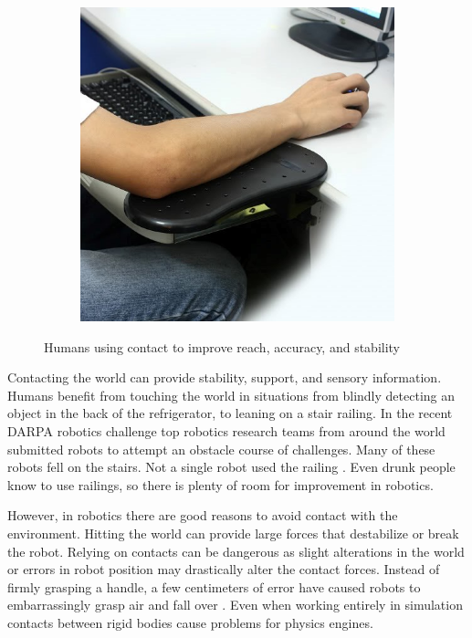 \documentclass[../thesis.tex]{subfiles}
\begin{document}
\begin{figure}
\begin{subfigure}[b]{0.3\linewidth}
    \includegraphics[width=\linewidth]{./Introduction/mouse.jpg}    
  \end{subfigure}
  \label{fig:HumanContact}
  \caption{Humans using contact to improve reach, accuracy, and stability}    
\end{figure}



Contacting the world can provide stability, support, and sensory information.
Humans benefit from touching the world in situations from blindly detecting an object in the back of the refrigerator, to leaning on a stair railing. 
In the recent DARPA robotics challenge top robotics research teams from around the world submitted robots to attempt an obstacle course of challenges.
Many of these robots fell on the stairs. 
Not a single robot used the railing \cite{Atkeson2015}.
Even drunk people know to use railings, so there is plenty of room for improvement in robotics.

However, in robotics there are good reasons to avoid contact with the environment.
Hitting the world can provide large forces that destabilize or break the robot.
Relying on contacts can be dangerous as slight alterations in the world or errors in robot position may drastically alter the contact forces.
Instead of firmly grasping a handle, a few centimeters of error have caused robots to embarrassingly grasp air and fall over \cite{DarpaRoboticsVideo}.
Even when working entirely in simulation contacts between rigid bodies cause problems for physics engines.
\end{document}

